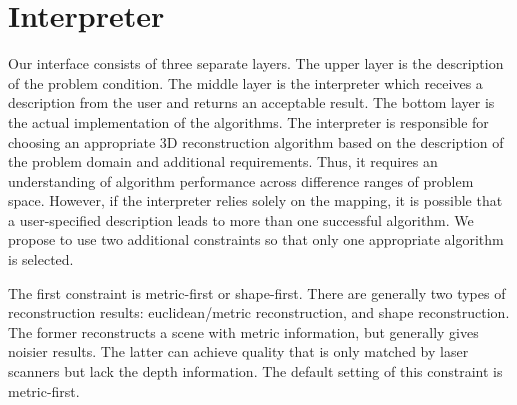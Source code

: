 


\section{Interpreter}
\label{sec:interp}
Our interface consists of three separate layers. The upper layer is the description of the problem condition. The middle layer is the interpreter which receives a description from the user and returns an acceptable result. The bottom layer is the actual implementation of the algorithms. The interpreter is responsible for choosing an appropriate 3D reconstruction algorithm based on the description of the problem domain and additional requirements. Thus, it requires an understanding of algorithm performance across difference ranges of problem space. However, if the interpreter relies solely on the mapping, it is possible that a user-specified description leads to more than one successful algorithm. We propose to use two additional constraints so that only one appropriate algorithm is selected.

The first constraint is metric-first or shape-first. There are generally two types of reconstruction results: euclidean/metric reconstruction, and shape reconstruction. The former reconstructs a scene with metric information, but generally gives noisier results. The latter can achieve quality that is only matched by laser scanners but lack the depth information. The default setting of this constraint is metric-first.

